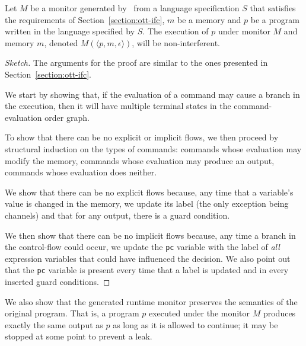 \documentclass[conference]{IEEEtran}
\begin{document}
\begin{theorem}
	Let $M$ be a monitor generated by \ottifc\ from a language specification $S$ that satisfies the requirements of Section~\ref{section:ott-ifc}, $m$ be a memory and $p$ be a program written in the language specified by $S$. The execution of $p$ under monitor $M$ and memory $m$, denoted $M(\langle p, m, \epsilon \rangle)$, will be non-interferent.
\end{theorem}
\begin{proof}[Sketch]
	The arguments for the proof are similar to the ones presented in Section~\ref{section:ott-ifc}. 
	
	We start by showing that, if the evaluation of a command may cause a branch in the execution, then it will have multiple terminal states in the command-evaluation order graph.

	To show that there can be no explicit or implicit flows, we then proceed by structural induction on the types of commands: commands whose evaluation may modify the memory, commands whose evaluation may produce an output, commands whose evaluation does neither.
	
	We show that there can be no explicit flows because, any time that a variable's value is changed in the memory, we update its label (the only exception being channels) and that for any output, there is a guard condition. 
	
	We then show that there can be no implicit flows because, any time a branch in the control-flow could occur, we update the \lstinline{pc} variable with the label of \emph{all} expression variables that could have influenced the decision. We also point out that the \lstinline{pc} variable is present every time that a label is updated and in every inserted guard conditions.
\end{proof}

We also show that the generated runtime monitor preserves the semantics of the original program. That is, a program $p$ executed under the monitor $M$ produces exactly the same output as $p$ as long as it is allowed to continue;  it may be stopped at some point to prevent a leak. 
\end{document}
